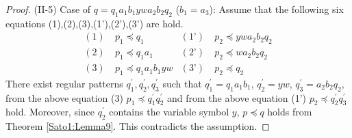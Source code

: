 \begin{proof}
\noindent
(II-5) Case of $q=q_{1}a_{1}b_{1}ywa_{2}b_{2}q_{2}$ ($b_{1}=a_{3}$):
Assume that the following six equations (1),(2),(3),(1'),(2'),(3') are hold.
\begin{align*}
(1)~& p_{1} \preceq q_{1} & (\text{1'})~& p_{2} \preceq ywa_{2}b_{2}q_{2} \\
(2)~& p_{1} \preceq q_{1}a_{1} & (\text{2'})~& p_{2} \preceq wa_{2}b_{2}q_{2} \\
(3)~& p_{1} \preceq q_{1}a_{1}b_{1}yw & (\text{3'})~& p_{2} \preceq q_{2}
\end{align*}
\noindent
There exist regular patterns $q_{1}^{\prime}, q_{2}^{\prime}, q_{3}^{\prime}$ such that $q_{1}^{\prime}=q_{1}a_{1}b_{1}$, $q_{2}^{\prime}=yw$, $q_{3}^{\prime}=a_{2}b_{2}q_{2}$, from the above equation (3) $p_{1} \preceq q_{1}^{\prime}q_{2}^{\prime}$ and from the above equation (1') $p_{2} \preceq q_{2}^{\prime}q_{3}^{\prime}$ hold.
Moreover, since $q_{2}^{\prime}$ contains the variable symbol $y$, $p\preceq q$ holds from Theorem \ref{Sato1:Lemma9}.
This contradicts the assumption.
\end{proof}

